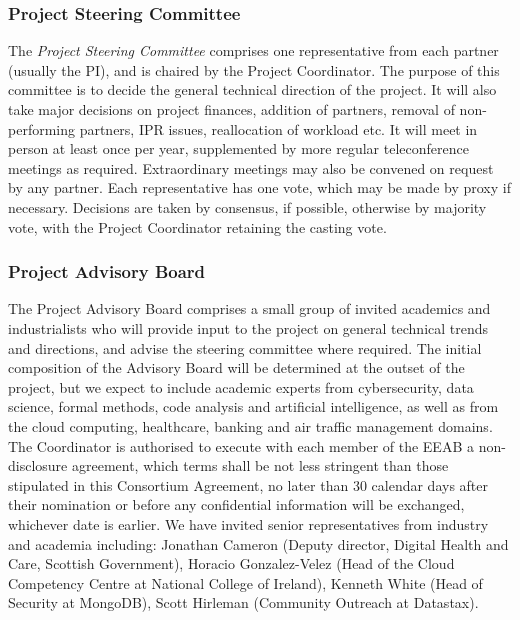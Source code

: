 \documentclass[a4paper,11pt]{article}
\begin{document}
\subsubsection*{Project Steering Committee}
\vspace{-5pt}

The \emph{Project Steering Committee} comprises one representative from each partner
(usually the PI), and is chaired by the Project Coordinator.  
The purpose of this committee is to decide
the general technical direction of the project.  It will also
take major decisions on project finances, addition of partners, removal of non-performing
partners, IPR issues, reallocation of workload etc.  It will meet in person
at least once per year, supplemented by more regular teleconference
meetings as required. Extraordinary meetings may also be convened on request by any partner.
Each representative has one vote, which
may be made by proxy if necessary.  Decisions are taken by
consensus, if possible, otherwise by majority vote, with the
Project Coordinator retaining the casting vote.

\subsubsection*{Project Advisory Board}
\vspace{-5pt}

The Project Advisory Board comprises a small group of invited
academics and industrialists who will provide input to the
project on general technical trends and directions, and advise
the steering committee where required.  The initial composition
of the Advisory Board will be determined at the outset of the
project, but we expect to include academic experts from cybersecurity, data science, formal methods, code analysis and artificial intelligence, as well as from the cloud computing, healthcare, banking and air traffic management domains. The Coordinator is authorised to 
execute with each member of the EEAB a non-disclosure agreement, which 
terms shall be not less stringent than those stipulated in this 
Consortium Agreement, no later than 30 calendar days after their nomination 
or before any confidential information will be exchanged, whichever date is earlier. 
We have invited senior representatives from industry and academia including: Jonathan Cameron (Deputy director, Digital Health and Care, Scottish Government), Horacio Gonzalez-Velez (Head of the Cloud Competency Centre at National College of Ireland), Kenneth White (Head of Security at MongoDB), Scott Hirleman (Community Outreach at Datastax). 
\end{document}
